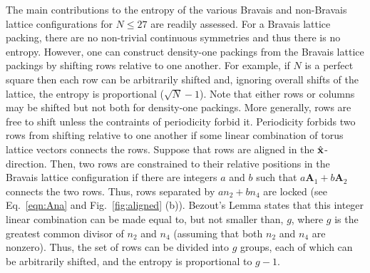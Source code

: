\documentclass[preprint,aps]{revtex4}
\newcommand{\ax}{{\bf a}_1}
\newcommand{\ay}{{\bf a}_2}
\begin{document}
The main contributions to the entropy of the various Bravais and non-Bravais lattice configurations for $N \leq 27$ are readily assessed. 
 For a Bravais lattice packing, there are no non-trivial continuous symmetries and thus there is no entropy.  However, one can construct density-one packings from the Bravais lattice packings by shifting rows relative to one another.  For example, if $N$ is a perfect square then each row can be arbitrarily shifted and, ignoring overall shifts of the lattice, the entropy is proportional  ($\sqrt{N}-1$).  Note that either rows or columns may be shifted but not both for density-one packings.  More generally, rows are free to shift unless the contraints of periodicity forbid it.  Periodicity forbids two rows from shifting relative to one another if some linear combination of torus lattice vectors connects the rows.  Suppose that rows are aligned in the $\hat{\bf x}$-direction.  Then, two rows are constrained to their relative positions in the Bravais lattice configuration if there are integers $a$ and $b$ such that $a \mathbf{A}_1 + b \mathbf{A}_2$ connects the two rows. Thus, rows separated by $a n_2 + b n_4$ are locked (see Eq.\ \ref{eqn:Ana} and Fig.\  \ref{fig:aligned} (b)).
Bezout's Lemma \cite{Jones1998} states that this integer linear combination can be made equal to, but not smaller than, $g$, where $g$ is the greatest common divisor of $n_2$ and $n_4$ (assuming that both $n_2$ and $n_4$ are nonzero). Thus, the set of rows can be divided into $g$ groups, each of which can be arbitrarily shifted, and the entropy is proportional to $g-1$.
\end{document}
